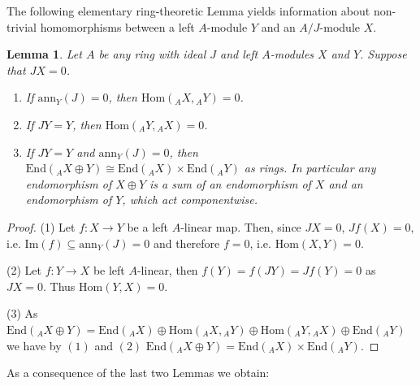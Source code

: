 \documentclass[oneside, a4paper, 11pt]{amsart}
\newtheorem{lemma}[theorem]{Lemma}
\newcommand{\ann}{\mathrm{ann}}
\newcommand{\End}{\mathrm{End}}
\newcommand{\Hom}{\mathrm{Hom}}
\begin{document}
The following elementary ring-theoretic Lemma yields information about non-trivial homomorphisms between a left $A$-module $Y$ and an $A/J$-module $X$.

\begin{lemma}\label{lemma2}
Let $A$ be any ring with ideal $J$ and left $A$-modules $X$ and $Y$. Suppose that $JX=0$.
\begin{enumerate}
    \item If $\ann_Y(J)=0$, then $\Hom( {_AX}, {_AY})=0$.
    \item If $JY=Y$, then $\Hom( {_AY}, {_AX})=0$.
    \item If $JY=Y$ and $\ann_Y(J)=0$, then 
    $\End({_AX\oplus Y}) \cong \End({_{A}X}) \times  \End({_AY})$
    as rings. In particular any endomorphism of $X\oplus Y$ is a sum of an endomorphism of $X$ and an endomorphism of 
$Y$, which act componentwise.
\end{enumerate}
\end{lemma}

\begin{proof}
(1) Let $f:X\rightarrow Y$ be a left $A$-linear map. Then, since $JX=0$, $Jf(X)=0$, i.e. $\mathrm{Im}(f) \subseteq \ann_Y(J)=0$ and therefore  $f=0$, i.e.  $\Hom(X,Y)=0$.

(2) Let $f:Y\rightarrow X$ be left $A$-linear, then $f(Y)=f(JY) = Jf(Y)=0$ as $JX=0$. Thus $\Hom(Y,X) = 0$.

(3) As $\End({_AX\oplus Y}) = \End({_AX}) \oplus  \Hom( {_AX}, {_AY}) \oplus  \Hom({_AY},{_AX}) \oplus \End({_AY})$ we have by $(1)$ and $(2)$
$\End({_AX\oplus Y}) = \End({_AX}) \times \End({_AY})$.
\end{proof}


As a consequence of the last two Lemmas we obtain:
\end{document}
